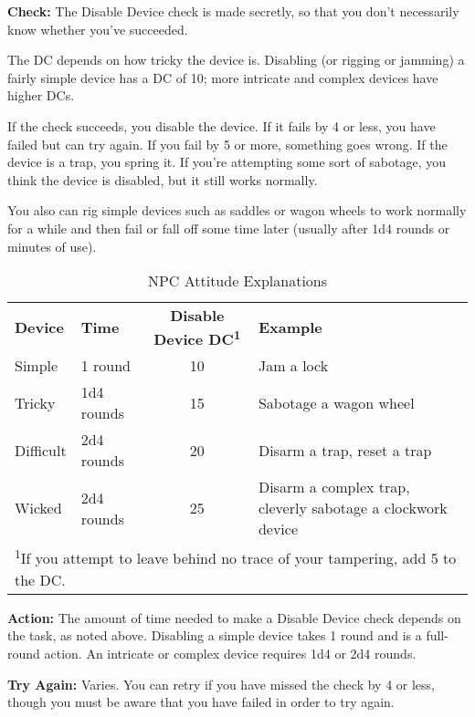 
\textbf{Check:} The Disable Device check is made secretly, so that you don't necessarily 
know whether you've succeeded.

The DC depends on how tricky the device is. Disabling (or rigging or jamming) a 
fairly simple device has a DC of 10; more intricate and complex devices have higher 
DCs.

If the check succeeds, you disable the device. If it fails by 4 or less, you have 
failed but can try again. If you fail by 5 or more, something goes wrong. If the 
device is a trap, you spring it. If you're attempting some sort of sabotage, you 
think the device is disabled, but it still works normally.

You also can rig simple devices such as saddles or wagon wheels to work normally 
for a while and then fail or fall off some time later (usually after 1d4 rounds 
or minutes of use).

\begin{table}[htb]
\caption{NPC Attitude Explanations}
\centering
\begin{tabular}{l l c l}
\textbf{Device} & \textbf{Time} & \textbf{Disable Device DC\textsuperscript{1}} & \textbf{Example}\\
Simple & 1 round & 10 & Jam a lock\\
Tricky & 1d4 rounds & 15 & Sabotage a wagon wheel\\
Difficult & 2d4 rounds & 20 & Disarm a trap, reset a trap\\
Wicked & 2d4 rounds & 25 & Disarm a complex trap, cleverly sabotage a clockwork device\\
\multicolumn{4}{l}{\textsuperscript{1}If you attempt to leave behind no trace of your tampering, add 5 to the DC.}\\
\end{tabular}
\end{table}

\textbf{Action:} The amount of time needed to make a Disable Device check depends 
on the task, as noted above. Disabling a simple device takes 1 round and is a full-round 
action. An intricate or complex device requires 1d4 or 2d4 rounds.

\textbf{Try Again:} Varies. You can retry if you have missed the check by 4 or 
less, though you must be aware that you have failed in order to try again.

